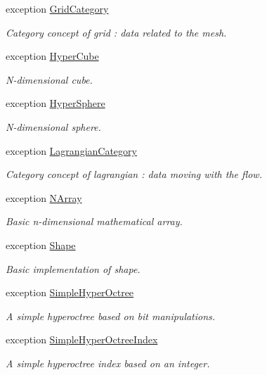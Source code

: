 \begin{DoxyCompactItemize}
exception \hyperlink{exceptionmagrathea_1_1GridCategory}{Grid\-Category}
\begin{DoxyCompactList}\small\item\em Category concept of grid \-: data related to the mesh. \end{DoxyCompactList}\item 
exception \hyperlink{exceptionmagrathea_1_1HyperCube}{Hyper\-Cube}
\begin{DoxyCompactList}\small\item\em N-\/dimensional cube. \end{DoxyCompactList}\item 
exception \hyperlink{exceptionmagrathea_1_1HyperSphere}{Hyper\-Sphere}
\begin{DoxyCompactList}\small\item\em N-\/dimensional sphere. \end{DoxyCompactList}\item 
exception \hyperlink{exceptionmagrathea_1_1LagrangianCategory}{Lagrangian\-Category}
\begin{DoxyCompactList}\small\item\em Category concept of lagrangian \-: data moving with the flow. \end{DoxyCompactList}\item 
exception \hyperlink{exceptionmagrathea_1_1NArray}{N\-Array}
\begin{DoxyCompactList}\small\item\em Basic n-\/dimensional mathematical array. \end{DoxyCompactList}\item 
exception \hyperlink{exceptionmagrathea_1_1Shape}{Shape}
\begin{DoxyCompactList}\small\item\em Basic implementation of shape. \end{DoxyCompactList}\item 
exception \hyperlink{exceptionmagrathea_1_1SimpleHyperOctree}{Simple\-Hyper\-Octree}
\begin{DoxyCompactList}\small\item\em A simple hyperoctree based on bit manipulations. \end{DoxyCompactList}\item 
exception \hyperlink{exceptionmagrathea_1_1SimpleHyperOctreeIndex}{Simple\-Hyper\-Octree\-Index}
\begin{DoxyCompactList}\small\item\em A simple hyperoctree index based on an integer. \end{DoxyCompactList}\item 

\end{DoxyCompactItemize}
